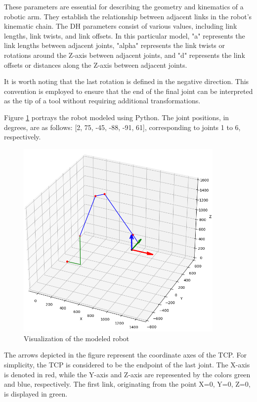 These parameters are essential for describing the geometry and kinematics of a robotic arm. They establish the relationship between adjacent links in the robot's kinematic chain. The \acrshort{DH} parameters consist of various values, including link lengths, link twists, and link offsets. In this particular model, "a" represents the link lengths between adjacent joints, "alpha" represents the link twists or rotations around the Z-axis between adjacent joints, and "d" represents the link offsets or distances along the Z-axis between adjacent joints.

It is worth noting that the last rotation is defined in the negative direction. This convention is employed to ensure that the end of the final joint can be interpreted as the tip of a tool without requiring additional transformations.

Figure \ref{robotprog} portrays the robot modeled using Python. The joint positions, in degrees, are as follows: [2, 75, -45, -88, -91, 61], corresponding to joints 1 to 6, respectively.

 \begin{figure}[H]
	\centerline{\includegraphics[width=0.9\textwidth]{figures/robotprog.png}}
	\caption{Visualization of the modeled robot}
	\label{robotprog}
\end{figure}


The arrows depicted in the figure represent the coordinate axes of the \acrshort{TCP}. For simplicity, the \acrshort{TCP} is considered to be the endpoint of the last joint. The X-axis is denoted in red, while the Y-axis and Z-axis are represented by the colors green and blue, respectively. The first link, originating from the point X=0, Y=0, Z=0, is displayed in green.

